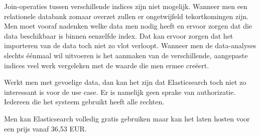 Join-operaties tussen verschillende indices zijn niet mogelijk. Wanneer men een relationele databank zomaar overzet zullen er ongetwijfeld tekortkomingen zijn. Men moet vooraf nadenken welke data men nodig heeft en ervoor zorgen dat die data beschikbaar is binnen eenzelfde index. Dat kan ervoor zorgen dat het importeren van de data toch niet zo vlot verloopt. Wanneer men de data-analyses slechts éénmaal wil uitvoeren is het aanmaken van de verschillende, aangepaste indices veel werk vergeleken met de waarde die men ermee creëert.

Werkt men met gevoelige data, dan kan het zijn dat Elasticsearch toch niet zo interessant is voor de use case. Er is namelijk geen sprake van authorizatie. Iedereen die het systeem gebruikt heeft alle rechten.

Men kan Elasticsearch volledig gratis gebruiken maar kan het laten hosten voor een prijs vanaf 36,53 EUR.